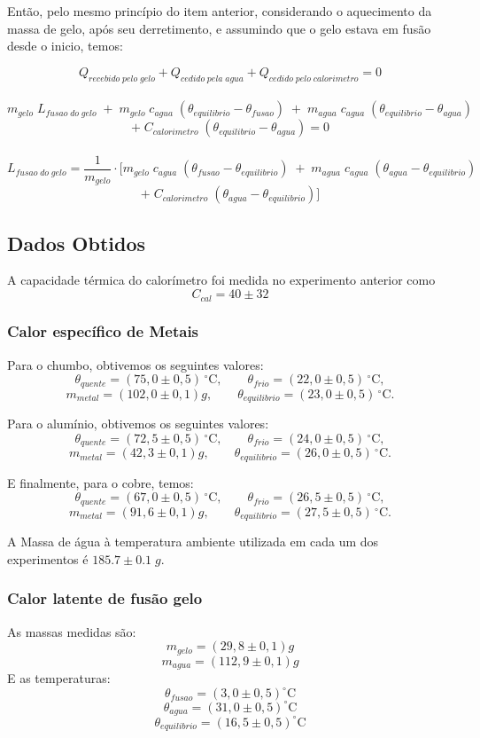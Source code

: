 \documentclass[12pt,a4paper]{article}
\begin{document}
Então, pelo mesmo princípio do item anterior, considerando o aquecimento da massa de gelo, após seu derretimento, e assumindo que o gelo estava em fusão desde o inicio, temos:

$$Q_{recebido\;pelo\;gelo} + Q_{cedido\;pela\;agua} + Q_{cedido\;pelo\;calorimetro} = 0$$\
$$m_{gelo} \; L_{fusao\;do\;gelo} \; + \; m_{gelo} \; c_{agua} \; (\theta_{equilibrio} - \theta_{fusao}) \; + \; m_{agua} \; c_{agua} \; (\theta_{equilibrio} - \theta_{agua}) \;$$ $$+ \; C_{calorimetro} \; (\theta_{equilibrio} - \theta_{agua}) = 0$$\
$$L_{fusao\;do\;gelo} = \frac{1}{m_{gelo}} \cdot [m_{gelo} \; c_{agua} \; (\theta_{fusao} - \theta_{equilibrio}) \; + \; m_{agua} \; c_{agua} \; (\theta_{agua} - \theta_{equilibrio}) \;$$ 
$$ + \; C_{calorimetro} \; (\theta_{agua} - \theta_{equilibrio})]$$


\subsection{Dados Obtidos}

A capacidade térmica do calorímetro foi medida no experimento anterior como
$$ C_{cal} = 40 \pm 32 $$
\subsubsection{Calor específico de Metais}
Para o chumbo, obtivemos os seguintes valores:
$$ \theta_{quente} = (75,0 \pm 0,5)\,^{\circ}\mathrm{C}, \qquad \theta_{frio} = (22,0 \pm 0,5)\,^{\circ}\mathrm{C}, $$
$$ m_{metal} = (102,0 \pm 0,1)g, \qquad \theta_{equilibrio} = (23,0 \pm 0,5)\,^{\circ}\mathrm{C}. $$


Para o alumínio, obtivemos os seguintes valores:
$$ \theta_{quente} = (72,5 \pm 0,5)\,^{\circ}\mathrm{C}, \qquad \theta_{frio} = (24,0 \pm 0,5)\,^{\circ}\mathrm{C}, $$
$$ m_{metal} = (42,3 \pm 0,1)g, \qquad \theta_{equilibrio} = (26,0 \pm 0,5)\,^{\circ}\mathrm{C}. $$


 E finalmente, para o cobre, temos:
$$ \theta_{quente} = (67,0 \pm 0,5)\,^{\circ}\mathrm{C}, \qquad \theta_{frio} = (26,5 \pm 0,5)\,^{\circ}\mathrm{C}, $$
$$ m_{metal} = (91,6 \pm 0,1)g, \qquad \theta_{equilibrio} = (27,5 \pm 0,5)\,^{\circ}\mathrm{C}. $$

A Massa de água à temperatura ambiente utilizada em cada um dos experimentos é $185.7 \pm 0.1 \; g$.

\subsubsection{Calor latente de fusão gelo}
As massas medidas são:
$$ m_{gelo} = (29,8 \pm 0,1) g $$
$$ m_{agua} = (112,9 \pm 0,1)g $$
E as temperaturas:
$$ \theta_{fusao} = (3,0 \pm 0,5)^{\circ}\mathrm{C} $$
$$ \theta_{agua} = (31,0 \pm 0,5)^{\circ}\mathrm{C} $$
$$ \theta_{equilibrio} = (16,5 \pm 0,5)^{\circ}\mathrm{C} $$
\end{document}
